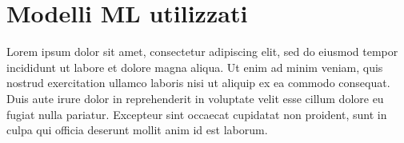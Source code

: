 \section{Modelli ML utilizzati} Lorem ipsum dolor sit amet, consectetur adipiscing elit, sed do eiusmod tempor incididunt ut labore et dolore magna aliqua. Ut enim ad minim veniam, quis nostrud exercitation ullamco laboris nisi ut aliquip ex ea commodo consequat. Duis aute irure dolor in reprehenderit in voluptate velit esse cillum dolore eu fugiat nulla pariatur. Excepteur sint occaecat cupidatat non proident, sunt in culpa qui officia deserunt mollit anim id est laborum.


